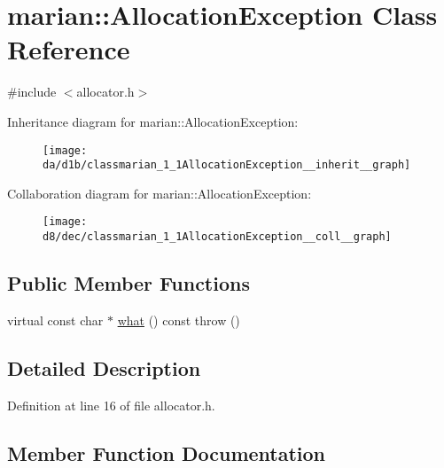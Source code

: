 \hypertarget{classmarian_1_1AllocationException}{}\section{marian\+:\+:Allocation\+Exception Class Reference}
\label{classmarian_1_1AllocationException}


{\ttfamily \#include $<$allocator.\+h$>$}



Inheritance diagram for marian\+:\+:Allocation\+Exception\+:
\nopagebreak
\begin{figure}[H]
\begin{center}
\leavevmode
\texttt{[image: da/d1b/classmarian\_1\_1AllocationException\_\_inherit\_\_graph]}
\end{center}
\end{figure}


Collaboration diagram for marian\+:\+:Allocation\+Exception\+:
\nopagebreak
\begin{figure}[H]
\begin{center}
\leavevmode
\texttt{[image: d8/dec/classmarian\_1\_1AllocationException\_\_coll\_\_graph]}
\end{center}
\end{figure}
\subsection*{Public Member Functions}
\begin{DoxyCompactItemize}
\item 
virtual const char $\ast$ \hyperlink{classmarian_1_1AllocationException_a2cf89eff1c158a74b7d34f5ca4a74d7a}{what} () const   throw ()
\end{DoxyCompactItemize}


\subsection{Detailed Description}


Definition at line 16 of file allocator.\+h.



\subsection{Member Function Documentation}
